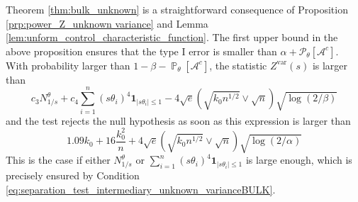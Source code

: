 \documentclass[twoside,11pt]{article}
\def\cA{\mathcal{A}}
\def\cP{\mathcal{P}}
\renewcommand{\P}{\operatorname{\mathbb{P}}}
\newcommand{\<}{\langle}
\renewcommand{\>}{\rangle}
\begin{document}
 Theorem \ref{thm:bulk_unknown} is a straightforward consequence of Proposition \ref{prp:power_Z_unknown variance} and Lemma \ref{lem:unform_control_characteristic_function}. The first upper bound in the above proposition ensures that the type I error is smaller than $\alpha+\cP_{\theta}[\cA^c]$. With probability larger than $1-\beta-\P_{\theta}[\cA^c]$, the statistic $Z^{\mathrm{var}}(s)$ is larger than 
\[c_3 N_{1/s}^{\theta} +  c_4 \sum_{i=1}^n (s\theta_i)^4 \mathbf{1}_{|s\theta_i|\leq 1}    - 4\sqrt{e} (\sqrt{k_0n^{1/2}}\vee \sqrt{n} )\sqrt{\log(2/\beta)} \]
and the test rejects the null hypothesis as soon as this expression is larger than 
\[
 1.09k_{0}+  16 \frac{k^2_0}{n} + 4 \sqrt{e}(\sqrt{k_0n^{1/2}}\vee \sqrt{n} ) \sqrt{\log(2/\alpha)}
\]
This is the case if either $N_{1/s}^{\theta}$ or $\sum_{i=1}^n (s\theta_i)^4 \mathbf{1}_{|s\theta_i|\leq 1}$ is large enough, which is precisely ensured by Condition \eqref{eq:separation_test_intermediary_unknown_varianceBULK}. 
\end{document}

